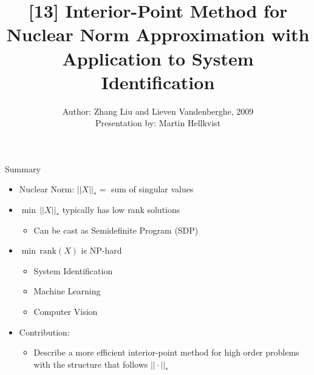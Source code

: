\documentclass{beamer}
\title{[13] Interior-Point Method for Nuclear Norm Approximation with Application to System Identification}
\author{Author: Zhang Liu and Lieven Vandenberghe, 2009\\ \footnotesize Presentation by: Martin Hellkvist}
\begin{document}
\begin{frame}[plain]
    \maketitle
\end{frame}
\begin{frame}{Summary}
	\begin{itemize}
		\item Nuclear Norm: $ ||X||_* =$ sum of singular values
		\item $ \min\,||X||_* $ typically has low rank solutions
		\begin{itemize}
			\item Can be cast as Semidefinite Program (SDP)
		\end{itemize}
		\item $ \min\,\text{rank}(X) $ is NP-hard
		\begin{itemize}
			\item System Identification
			\item Machine Learning
			\item Computer Vision
		\end{itemize}
		\item Contribution:
		\begin{itemize}
			\item Describe a more efficient interior-point method for high order problems with the structure that follows $ ||\cdot||_* $
		\end{itemize}
	\end{itemize}
\end{frame}
\end{document}
